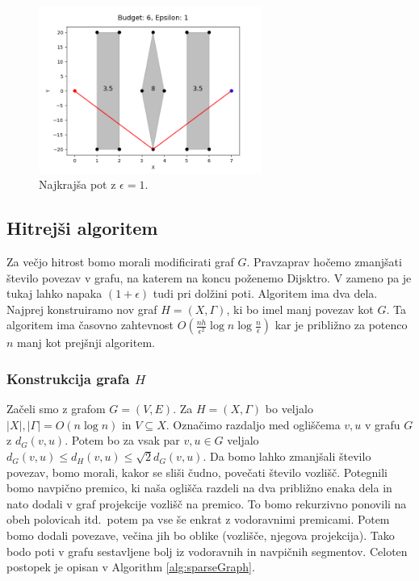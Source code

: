 \documentclass{article}
\begin{document}
\begin{figure}[ht]
    \centering
    \includegraphics[width=0.65\textwidth]{errPathEps1.png}
    \caption{Najkrajša pot z $\epsilon = 1$.}
    \label{fig:errP05}
\end{figure}




\subsection*{Hitrejši algoritem}

Za večjo hitrost bomo morali modificirati graf $G$. Pravzaprav hočemo zmanjšati število povezav v grafu, na katerem na koncu poženemo Dijsktro. V zameno pa je tukaj lahko napaka $(1+\epsilon)$ tudi pri dolžini poti. Algoritem ima dva dela. Najprej konstruiramo nov graf $H = (X,\Gamma)$, ki bo imel manj povezav kot $G$. Ta algoritem ima časovno zahtevnost $O(\frac{nh}{\epsilon^2}\log n \log \frac{n}{\epsilon})$ kar je približno za potenco $n$ manj kot prejšnji algoritem.

\subsubsection*{Konstrukcija grafa $H$}

Začeli smo z grafom $G = (V,E)$. Za $H = (X,\Gamma)$ bo veljalo $|X|, |\Gamma| = O(n \log n)$ in $V \subseteq X$. Označimo razdaljo med ogliščema $v,u$ v grafu $G$ z $d_G(v,u)$. Potem bo za vsak par $v,u \in G$ veljalo  $d_G(v,u) \leq d_H(v,u) \leq \sqrt{2}d_G(v,u)$. Da bomo lahko zmanjšali število povezav, bomo morali, kakor se sliši čudno, povečati število vozlišč. Potegnili bomo navpično premico, ki naša oglišča razdeli na dva približno enaka dela in nato dodali v graf projekcije vozlišč na premico. To bomo rekurzivno ponovili na obeh polovicah itd.\, potem pa vse še enkrat z vodoravnimi premicami. Potem bomo dodali povezave, večina jih bo oblike (vozlišče, njegova projekcija). Tako bodo poti v grafu sestavljene bolj iz vodoravnih in navpičnih segmentov. Celoten postopek je opisan v Algorithm \ref{alg:sparseGraph}.
\end{document}
